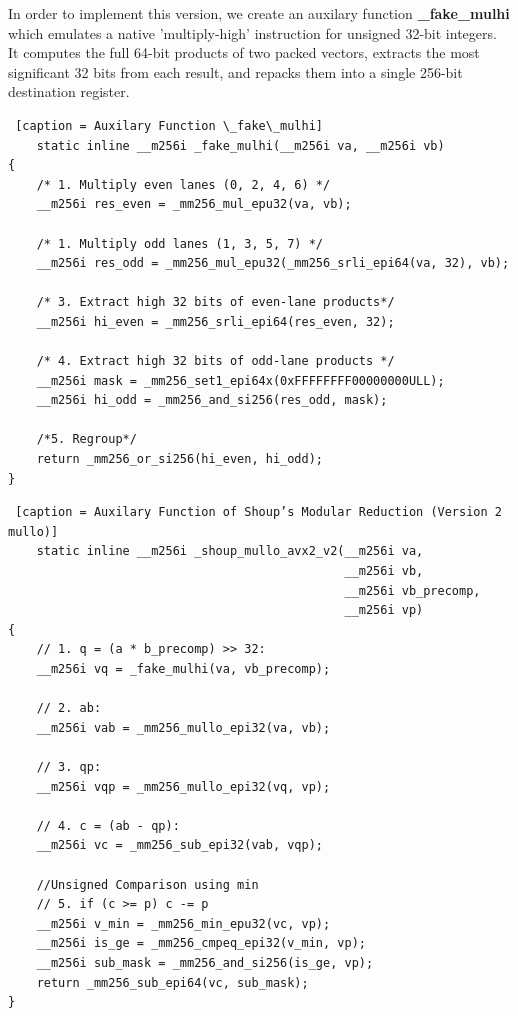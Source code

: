 \documentclass{article}
\begin{document}
In order to implement this version, we create an auxilary function \textbf{\_fake\_mulhi} which emulates a native 'multiply-high' 
instruction for unsigned 32-bit integers. It computes the full 64-bit products of two packed vectors, 
extracts the most significant 32 bits from each result, and repacks them into a single 256-bit 
destination register.

\begin{lstlisting} [caption = Auxilary Function \_fake\_mulhi]
    static inline __m256i _fake_mulhi(__m256i va, __m256i vb)
{
    /* 1. Multiply even lanes (0, 2, 4, 6) */
    __m256i res_even = _mm256_mul_epu32(va, vb);

    /* 1. Multiply odd lanes (1, 3, 5, 7) */
    __m256i res_odd = _mm256_mul_epu32(_mm256_srli_epi64(va, 32), vb);

    /* 3. Extract high 32 bits of even-lane products*/
    __m256i hi_even = _mm256_srli_epi64(res_even, 32);

    /* 4. Extract high 32 bits of odd-lane products */
    __m256i mask = _mm256_set1_epi64x(0xFFFFFFFF00000000ULL);
    __m256i hi_odd = _mm256_and_si256(res_odd, mask);

    /*5. Regroup*/
    return _mm256_or_si256(hi_even, hi_odd);
}
\end{lstlisting}
\begin{lstlisting} [caption = Auxilary Function of Shoup’s Modular Reduction (Version 2 mullo)]
    static inline __m256i _shoup_mullo_avx2_v2(__m256i va, 
                                               __m256i vb, 
                                               __m256i vb_precomp, 
                                               __m256i vp)
{
    // 1. q = (a * b_precomp) >> 32:
    __m256i vq = _fake_mulhi(va, vb_precomp);

    // 2. ab:
    __m256i vab = _mm256_mullo_epi32(va, vb);

    // 3. qp:
    __m256i vqp = _mm256_mullo_epi32(vq, vp);

    // 4. c = (ab - qp):
    __m256i vc = _mm256_sub_epi32(vab, vqp);

    //Unsigned Comparison using min
    // 5. if (c >= p) c -= p
    __m256i v_min = _mm256_min_epu32(vc, vp);
    __m256i is_ge = _mm256_cmpeq_epi32(v_min, vp);
    __m256i sub_mask = _mm256_and_si256(is_ge, vp);
    return _mm256_sub_epi64(vc, sub_mask);
}
\end{lstlisting}
\end{document}
